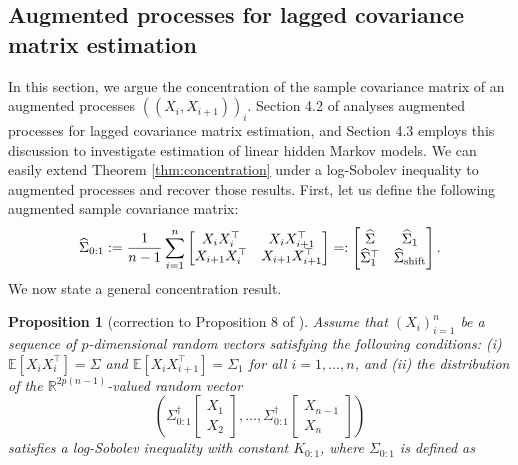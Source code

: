\documentclass[11pt,a4paper]{article}
\newtheorem{proposition}[theorem]{Proposition}
\theoremstyle{remark}
\theoremstyle{definition}
\newcommand{\bX}{X}
\newcommand{\bSigma}{\Sigma}
\newcommand{\R}{\mathbb{R}}
\newcommand{\E}{\mathbb{E}}
\theoremstyle{definition}
\renewcommand{\hat}{\widehat}
\begin{document}
\begin{bibunit}[apalike]
\subsection{Augmented processes for lagged covariance matrix estimation}\label{corr:sec:example:aug}
In this section, we argue the concentration of the sample covariance matrix of an augmented processes $((\bX_{i},\bX_{i+1}))_{i}$.
Section 4.2 of \citet{nakakita2024dimension} analyses augmented processes for lagged covariance matrix estimation, and Section 4.3 employs this discussion to investigate estimation of linear hidden Markov models.
We can easily extend Theorem \ref{thm:concentration} under a log-Sobolev inequality to augmented processes and recover those results.
First, let us define the following augmented sample covariance matrix:
\begin{equation*}
    \hat{\bSigma}_{0:1}:=\frac{1}{n-1}\sum_{i=1}^{n}\left[\begin{matrix}
        \bX_{i}\bX_{i}^{\top} & \bX_{i}\bX_{i+1}^{\top}\\
        \bX_{i+1}\bX_{i}^{\top} & \bX_{i+1}\bX_{i+1}^{\top}
    \end{matrix}\right]=:\left[\begin{matrix}
        \hat{\bSigma} & \hat{\bSigma}_{1}\\
        \hat{\bSigma}_{1}^{\top} & \hat{\bSigma}_{\textnormal{shift}}
    \end{matrix}\right].
\end{equation*}
We now state a general concentration result.
\begin{proposition}[correction to Proposition 8 of \citealp{nakakita2024dimension}]\label{prp:aug}
Assume that $(\bX_{i})_{i=1}^{n}$ be a sequence of $p$-dimensional random vectors satisfying the following conditions: (i) $\E[\bX_{i}\bX_{i}^{\top}]=\bSigma$ and $\E[\bX_{i}\bX_{i+1}^{\top}]=\bSigma_{1}$ for all $i=1,\ldots,n$,
and (ii) the distribution of the $\R^{2p(n-1)}$-valued random vector
\begin{equation*}
    \left(\bSigma_{0:1}^{\dagger}\left[\begin{matrix}\bX_{1}\\
    \bX_{2}
    \end{matrix}\right],\ldots,\bSigma_{0:1}^{\dagger}\left[\begin{matrix}\bX_{n-1}\\
    \bX_{n}\end{matrix}\right]\right)
\end{equation*}
satisfies a log-Sobolev inequality with constant $K_{0:1}$, where $\bSigma_{0:1}$ is defined as

\end{proposition}
\end{bibunit}
\end{document}
